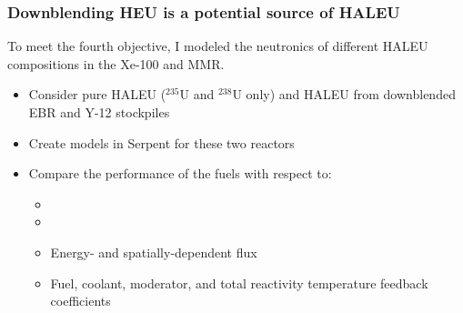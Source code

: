 \begin{frame}
    \frametitle{Downblending HEU is a potential source of HALEU}
    To meet the fourth objective, I modeled the neutronics of 
    different HALEU compositions in the Xe-100 and MMR.
    \begin{itemize}
        \item Consider pure HALEU ($^{235}$U and $^{238}$U only)
              and HALEU from downblended \gls{EBR} 
              \cite{vaden_isotopic_2018} and Y-12 
              \cite{nelson_foreign_2010} stockpiles
        \item Create models in Serpent \cite{leppanen_serpent_2013} 
              for these two reactors
        \item Compare the performance of the fuels with respect to:
        \begin{itemize}
            \item \keff
            \item \betaEff
            \item Energy- and spatially-dependent flux
            \item Fuel, coolant, moderator, and total reactivity
                  temperature feedback coefficients
        \end{itemize}
    \end{itemize}

\end{frame}

